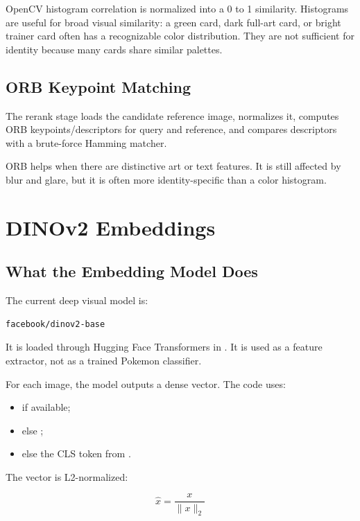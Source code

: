 \documentclass[11pt,a4paper]{article}
\begin{document}
OpenCV histogram correlation is normalized into a 0 to 1 similarity. Histograms are useful for broad visual similarity: a green card, dark full-art card, or bright trainer card often has a recognizable color distribution. They are not sufficient for identity because many cards share similar palettes.

\subsection{ORB Keypoint Matching}

The rerank stage loads the candidate reference image, normalizes it, computes ORB keypoints/descriptors for query and reference, and compares descriptors with a brute-force Hamming matcher.

ORB helps when there are distinctive art or text features. It is still affected by blur and glare, but it is often more identity-specific than a color histogram.

\section{DINOv2 Embeddings}

\subsection{What the Embedding Model Does}

The current deep visual model is:

\begin{lstlisting}
facebook/dinov2-base
\end{lstlisting}

It is loaded through Hugging Face Transformers in . It is used as a feature extractor, not as a trained Pokemon classifier.

For each image, the model outputs a dense vector. The code uses:

\begin{itemize}
  \item {} if available;
  \item else ;
  \item else the CLS token from .
\end{itemize}

The vector is L2-normalized:

\[
\hat{x} = \frac{x}{\|x\|_2}
\]
\end{document}

